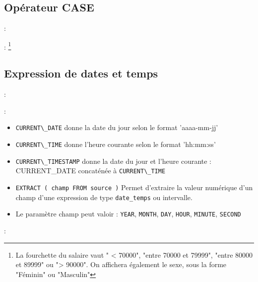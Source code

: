 \documentclass[10pt]{beamer}
\begin{document}
\subsection{Opérateur CASE}
\begin{frame}{\secname : \subsecname}
    
\end{frame}

\begin{frame}{\secname : \subsecname}
    \footnote{
        La fourchette du salaire vaut " < 70000", "entre 70000 et 79999", "entre 80000 et 89999" ou "> 90000".
        On affichera également le sexe, sous la forme "Féminin" ou "Masculin"}
\end{frame}

\subsection{Expression de dates et temps}
\begin{frame}{\secname : \subsecname}
    
\end{frame}

\begin{frame}{\secname : \subsecname}
    \begin{itemize}
        \item \lstinline[language=plsql]!CURRENT\_DATE! donne la date du jour selon le format 'aaaa-mm-jj'
        \item \lstinline[language=plsql]!CURRENT\_TIME! donne l'heure courante selon le format 'hh:mm:ss'
        \item \lstinline[language=plsql]!CURRENT\_TIMESTAMP! donne la date du jour et l'heure courante : CURRENT\_DATE concaténée à \lstinline[language=plsql]!CURRENT\_TIME!
        \item \lstinline[language=bnf]!EXTRACT ( champ FROM source )! Permet d'extraire la valeur numérique d'un champ d'une expression de type \lstinline[language=bnf]!date_temps! ou intervalle.
        \item Le paramètre champ peut valoir : \lstinline[language=plsql]!YEAR!, \lstinline[language=plsql]!MONTH!, \lstinline[language=plsql]!DAY!, \lstinline[language=plsql]!HOUR!, \lstinline[language=plsql]!MINUTE!, \lstinline[language=plsql]!SECOND!
    \end{itemize}
\end{frame}
\begin{frame}{\secname : \subsecname}
    
\end{frame}
\end{document}
